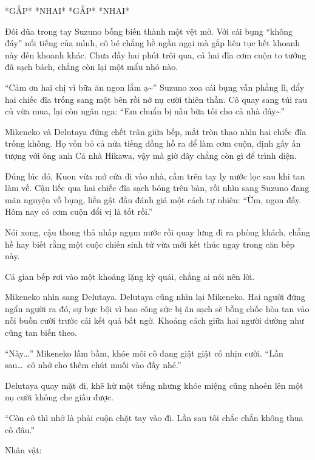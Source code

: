 ﻿\documentclass[../main.tex]{subfiles}
\begin{document}
*GẮP* *NHAI* *GẮP* *NHAI*

Đôi đũa trong tay Suzuno bỗng biến thành một vệt mờ. Với cái bụng ``không đáy'' nổi tiếng của mình, cô bé chẳng hề ngần ngại mà gắp liên tục hết khoanh này đến khoanh khác. Chưa đầy hai phút trôi qua, cả hai đĩa cơm cuộn to tướng đã sạch bách, chẳng còn lại một mẩu nhỏ nào.

``Cảm ơn hai chị vì bữa ăn ngon lắm ạ\~{}'' Suzuno xoa cái bụng vẫn phẳng lì, đẩy hai chiếc đĩa trống sang một bên rồi nở nụ cười thiên thần. Cô quay sang túi rau củ vừa mua, lại còn ngân nga: ``Em chuẩn bị nấu bữa tối cho cả nhà đây\~{}''

Mikeneko và Delutaya đứng chết trân giữa bếp, mắt tròn thao nhìn hai chiếc đĩa trống không. Họ vốn bỏ cả nửa tiếng đồng hồ ra để làm cơm cuộn, định gây ấn tượng với ông anh Cả nhà Hikawa, vậy mà giờ đây chẳng còn gì để trình diện.

Đúng lúc đó, Kuon vừa mở cửa đi vào nhà, cầm trên tay ly nước lọc sau khi tan làm về. Cậu liếc qua hai chiếc đĩa sạch bóng trên bàn, rồi nhìn sang Suzuno đang mãn nguyện vỗ bụng, liền gật đầu đánh giá một cách tự nhiên: ``Ừm, ngon đấy. Hôm nay có cơm cuộn đổi vị là tốt rồi.''

Nói xong, cậu thong thả nhấp ngụm nước rồi quay lưng đi ra phòng khách, chẳng hề hay biết rằng một cuộc chiến sinh tử vừa mới kết thúc ngay trong căn bếp này.

Cả gian bếp rơi vào một khoảng lặng kỳ quái, chẳng ai nói nên lời.

Mikeneko nhìn sang Delutaya. Delutaya cũng nhìn lại Mikeneko. Hai người đứng ngẩn người ra đó, sự bực bội vì bao công sức bị ăn sạch sẽ bỗng chốc hòa tan vào nỗi buồn cười trước cái kết quá bất ngờ. Khoảng cách giữa hai người dường như cũng tan biến theo.

``Này\dots{}'' Mikeneko lầm bầm, khóe môi cô đang giật giật cố nhịn cười. ``Lần sau\dots\ cô nhớ cho thêm chút muối vào đấy nhé.''

Delutaya quay mặt đi, khẽ hừ một tiếng nhưng khóe miệng cũng nhoẻn lên một nụ cười không che giấu được.

``Còn cô thì nhớ là phải cuộn chặt tay vào đi. Lần sau tôi chắc chắn không thua cô đâu.''

\newpage

\begin{center}
    {\caviar\fontsize{12pt}{12pt}\selectfont Nhân vật:  }
\end{center}
\end{document}
